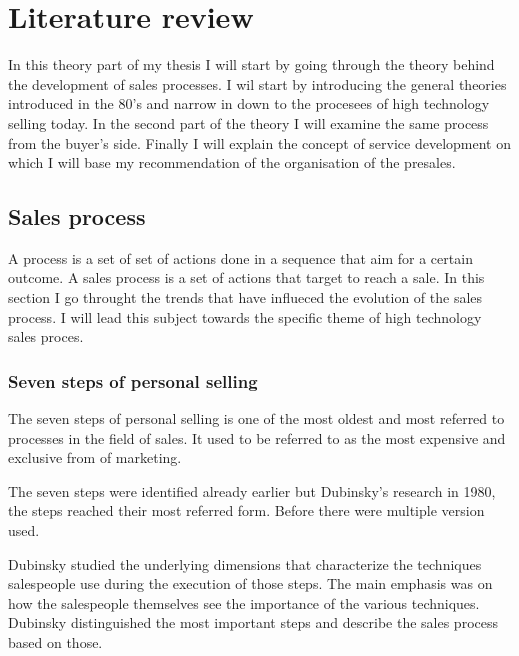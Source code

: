 \documentclass[12pt,a4paper,oneside,pdftex]{report}
\begin{document}
{{%

\chapter{Literature review}
\label{chapter:Theory}


In this theory part of my thesis I will start by going through the theory behind the development of sales processes. I wil start by introducing the general theories introduced in the 80's and narrow in down to the procesees of high technology selling today. 
In the second part of the theory I will examine the same process from the buyer's side. 
Finally I will explain the concept of service development on which I will base my recommendation of the organisation of the presales. 


\section{Sales process}
\label{sec:environments}
A process is a set of set of actions done in a sequence that aim for a certain outcome. A sales process is a set of actions that target to reach a sale. In this section I go throught the trends that have influeced the evolution of the sales process. I will lead this subject towards the specific theme of high technology sales proces.  


\subsection{Seven steps of personal selling}

The seven steps of personal selling is one of the most oldest and most referred to processes in the field of sales. It used to be referred to as the most expensive and exclusive from of marketing. 

The seven steps were identified already earlier but Dubinsky's research in 1980, the steps reached their most referred form. Before there were multiple version used. 

Dubinsky studied the underlying dimensions that characterize the techniques salespeople use during the execution of those steps. The main emphasis was on how the salespeople themselves see the importance of the various techniques. Dubinsky distinguished the most important steps and describe the sales process based on those. 


}}
\end{document}
